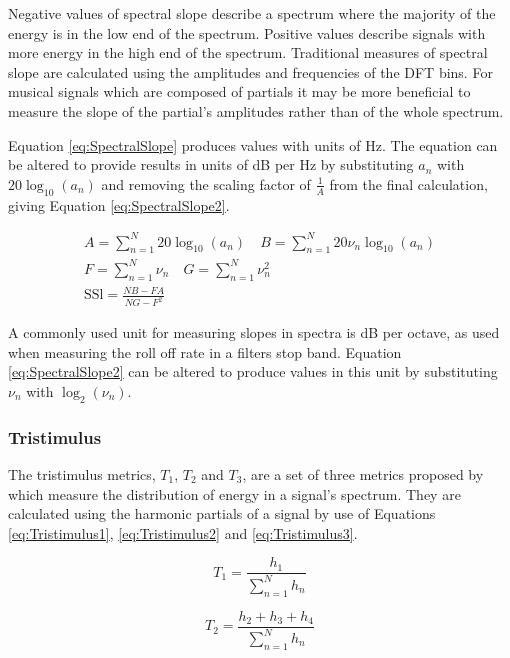 			Negative values of spectral slope describe a spectrum where the majority of the energy is in the
			low end of the spectrum. Positive values describe signals with more energy in the high end of the
			spectrum. Traditional measures of spectral slope are calculated using the amplitudes and
			frequencies of the DFT bins. For musical signals which are composed of partials it may be more
			beneficial to measure the slope of the partial's amplitudes rather than of the whole spectrum. 
			
			Equation \ref{eq:SpectralSlope} produces values with units of Hz. The equation can be
			altered to provide results in units of dB per Hz by substituting $a_{n}$ with $20\log_{10}(a_{n})$
			and removing the scaling factor of $\frac{1}{A}$ from the final calculation, giving Equation
			\ref{eq:SpectralSlope2}.
			
			\begin{gather}
				A = \sum_{n = 1}^{N} 20\log_{10}(a_{n})
				\quad 
				B = \sum_{n = 1}^{N} 20\nu_{n}\log_{10}(a_{n}) \nonumber \\
				F = \sum_{n = 1}^{N} \nu_{n} \quad G = \sum_{n = 1}^{N} \nu_{n}^{2} \nonumber \\
				\textrm{SSl} = \frac{NB - FA}{NG - F^{2}}
				\label{eq:SpectralSlope2}
			\end{gather}
			
			A commonly used unit for measuring slopes in spectra is dB per octave, as used when measuring the
			roll off rate in a filters stop band. Equation \ref{eq:SpectralSlope2} can be altered to produce
			values in this unit by substituting $\nu_{n}$ with $\log_{2}(\nu_{n})$.

		\subsubsection*{Tristimulus}
			The tristimulus metrics, $T_{1}$, $T_{2}$ and $T_{3}$, are a set of three metrics proposed by
			\citet{pollard1982a} which measure the distribution of energy in a signal's spectrum. They are
			calculated using the harmonic partials of a signal by use of Equations \ref{eq:Tristimulus1},
			\ref{eq:Tristimulus2} and \ref{eq:Tristimulus3}.
			
			\begin{equation}
				T_{1} = \frac{h_{1}}{\sum_{n = 1}^{N} h_{n}}
				\label{eq:Tristimulus1}
			\end{equation}

			\begin{equation}
				T_{2} = \frac{h_{2} + h_{3} + h_{4}}{\sum_{n = 1}^{N} h_{n}}
				\label{eq:Tristimulus2}
			\end{equation}

